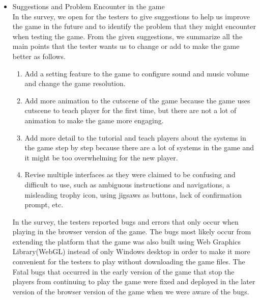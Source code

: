 \documentclass[12pt,oneside,openright,a4paper]{cpe-english-project}
\begin{document}
\begin{itemize}
	\item Suggestions and Problem Encounter in the game \\
	In the survey, we open for the testers to give suggestions to help us improve the game in the future and to identify the problem that they might encounter when testing the game. From the given suggestions, we summarize all the main points that the tester wants us to change or add to make the game better as follows.
	\begin{enumerate}
	\item Add a setting feature to the game to configure sound and music volume and change the game resolution.
	\item Add more animation to the cutscene of the game because the game uses cutscene to teach player for the first time, but there are not a lot of animation to make the game more engaging.
	\item Add more detail to the tutorial and teach players about the systems in the game step by step because there are a lot of systems in the game and it might be too overwhelming for the new player.
	\item Revise multiple interfaces as they were claimed to be confusing and difficult to use, such as ambiguous instructions and navigations, a misleading trophy icon, using jigsaws as buttons, lack of confirmation prompt, etc.
	\end{enumerate}
	In the survey, the testers reported bugs and errors that only occur when playing in the browser version of the game. The bugs most likely occur from extending the platform that the game was also built using Web Graphics Library(WebGL) instead of only Windows desktop in order to make it more convenient for the testers to play without downloading the game files. The Fatal bugs that occurred in the early version of the game that stop the players from continuing to play the game were fixed and deployed in the later version of the browser version of the game when we were aware of the bugs.

\end{itemize}
\end{document}
